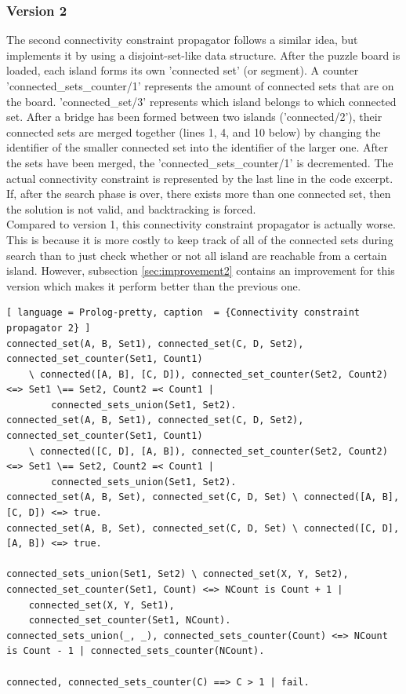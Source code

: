 \documentclass{report}
\begin{document}
\subsubsection{Version 2}
The second connectivity constraint propagator follows a similar idea, but implements it by using a disjoint-set-like data structure. After the puzzle board is loaded, each island forms its own 'connected set' (or segment). A counter 'connected\_sets\_counter/1' represents the amount of connected sets that are on the board. 'connected\_set/3' represents which island belongs to which connected set. After a bridge has been formed between two islands ('connected/2'), their connected sets are merged together (lines 1, 4, and 10 below) by changing the identifier of the smaller connected set into the identifier of the larger one. After the sets have been merged, the 'connected\_sets\_counter/1' is decremented. The actual connectivity constraint is represented by the last line in the code excerpt. If, after the search phase is over, there exists more than one connected set, then the solution is not valid, and backtracking is forced. \\
Compared to version 1, this connectivity constraint propagator is actually worse. This is because it is more costly to keep track of all of the connected sets during search than to just check whether or not all island are reachable from a certain island. However, subsection \ref{sec:improvement2} contains an improvement for this version which makes it perform better than the previous one.
\newpage

\begin{lstlisting}[ language = Prolog-pretty, caption  = {Connectivity constraint propagator 2} ]
connected_set(A, B, Set1), connected_set(C, D, Set2), connected_set_counter(Set1, Count1)
    \ connected([A, B], [C, D]), connected_set_counter(Set2, Count2)  <=> Set1 \== Set2, Count2 =< Count1 |
        connected_sets_union(Set1, Set2).
connected_set(A, B, Set1), connected_set(C, D, Set2), connected_set_counter(Set1, Count1)
    \ connected([C, D], [A, B]), connected_set_counter(Set2, Count2)  <=> Set1 \== Set2, Count2 =< Count1 |
        connected_sets_union(Set1, Set2).
connected_set(A, B, Set), connected_set(C, D, Set) \ connected([A, B], [C, D]) <=> true.
connected_set(A, B, Set), connected_set(C, D, Set) \ connected([C, D], [A, B]) <=> true.

connected_sets_union(Set1, Set2) \ connected_set(X, Y, Set2), connected_set_counter(Set1, Count) <=> NCount is Count + 1 |
    connected_set(X, Y, Set1),
    connected_set_counter(Set1, NCount).
connected_sets_union(_, _), connected_sets_counter(Count) <=> NCount is Count - 1 | connected_sets_counter(NCount).

connected, connected_sets_counter(C) ==> C > 1 | fail.
\end{lstlisting}
\end{document}

